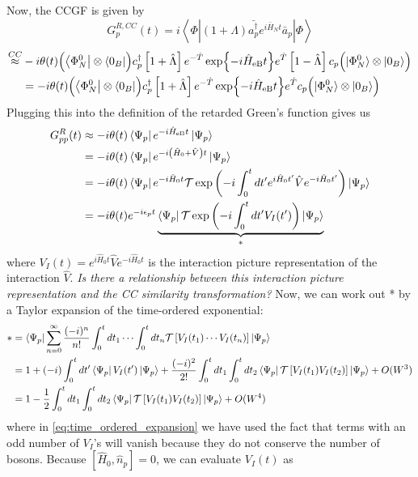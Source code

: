 Now, the CCGF is given by
\begin{equation}
G^{R,CC}_{p}(t) = i \left< \Phi \left| (1+\Lambda) \bar{a^{\dagger}_p}
e^{i \bar{H}_N t}
\bar{a}_p \right| \Phi \right>
\end{equation}
\begin{align}
\overset{CC}{\approx} & -i \theta(t) \Bigl(\bra{\Phi^0_{N}}\otimes\bra{0_B}\Bigr) c_p^\dagger \left[1+\hat{\Lambda} \right] e^{-\hat{T}} \exp{-i \hat{H}_{\text{eB}} t} e^{\hat{T}}\left[1-\hat{\Lambda} \right]  c_p \Bigl(|\Phi^0_{N}\rangle \otimes |0_B\rangle\Bigr) \\
&= -i \theta(t) \Bigl(\bra{\Phi^0_{N}}\otimes\bra{0_B}\Bigr) c_p^\dagger \left[1+\hat{\Lambda} \right] e^{-\hat{T}} \exp{-i \hat{H}_{\text{eB}} t} e^{\hat{T}}  c_p \Bigl(|\Phi^0_{N}\rangle \otimes |0_B\rangle\Bigr)
\end{align}
Plugging this into the definition of the retarded Green's function gives us
\begin{align}
G_{pp}^R(t) &\approx -i \theta(t) \bra{\Psi_p} e^{-i\hat{H}_{\text{eB}} t} \ket{\Psi_p} \\
&= -i \theta(t) \bra{\Psi_p} e^{-i\left( \hat{H}_0 + \hat{V} \right) t} \ket{\Psi_p} \\
&= -i \theta(t) \bra{\Psi_p} e^{-i\hat{H}_0 t} \mathcal{T} \exp \left( -i \int_0^t dt' e^{i\hat{H}_0 t'} \hat{V} e^{-i\hat{H}_0 t'} \right) \ket{\Psi_p} \\
&= -i \theta(t) e^{-i\epsilon_p t} \underbrace{\bra{\Psi_p}  \mathcal{T} \exp \left( -i \int_0^t dt' V_I(t') \right) \ket{\Psi_p}}_{*}
\end{align}
where $V_I(t) = e^{i\hat{H}_0 t} \hat{V} e^{-i\hat{H}_0 t}$ is the interaction picture representation of the interaction $\hat{V}$. \emph{Is there a relationship between this interaction picture representation and the CC similarity transformation?} Now, we can work out * by a Taylor expansion of the time-ordered exponential:
\begin{align}
* &= \bra{\Psi_p} \sum_{n=0}^\infty \frac{(-i)^n}{n!} \int_0^t dt_1 \cdots \int_0^t dt_n \mathcal{T} \left[ V_I(t_1) \cdots V_I(t_n) \right] \ket{\Psi_p} \\
&= 1 + (-i) \int_0^t dt' \bra{\Psi_p} V_I(t') \ket{\Psi_p} + \frac{(-i)^2}{2!} \int_0^t dt_1 \int_0^t dt_2 \bra{\Psi_p} \mathcal{T} \left[ V_I(t_1) V_I(t_2) \right] \ket{\Psi_p} + O(W^3) \\
&= 1 - \frac{1}{2} \int_0^t dt_1 \int_0^t dt_2 \bra{\Psi_p} \mathcal{T} \left[ V_I(t_1) V_I(t_2) \right] \ket{\Psi_p} + O(W^4) \label{eq:time_ordered_expansion}
\end{align}
where in \ref{eq:time_ordered_expansion} we have used the fact that terms with an odd number of $V_I$'s will vanish because they do not conserve the number of bosons. Because $[\hat{H}_0, \hat{n}_p] = 0$, we can evaluate $V_I(t)$ as

